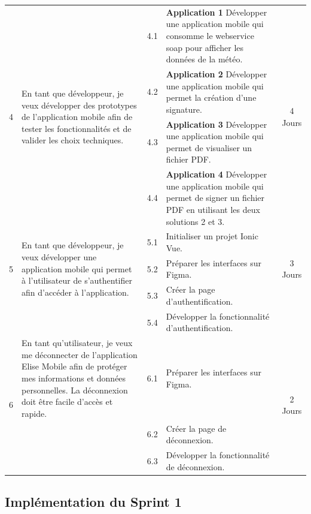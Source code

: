 \begin{adjustwidth}{-1cm}{}
\begin{longtable}{|c|p{6cm}|c|p{6cm}|c|}
    \cline{1-5}
    \multirow{4}{*}{4} & \multirow{4}{6cm}{En tant que développeur, je veux développer des prototypes de l'application mobile afin de tester les fonctionnalités et de valider les choix techniques.} &  4.1 &\textbf{Application 1} Développer une application mobile qui consomme le webservice soap pour afficher les données de la météo.&\multirow{4}{2cm}{4 Jours}\\
    \cline{3-4}
    &  &  4.2 &\textbf{Application 2} Développer une application mobile qui permet la création d'une signature.&\\
    \cline{3-4}
    &  &  4.3 &\textbf{Application 3} Développer une application mobile qui permet de visualiser un fichier PDF.&\\
    \cline{3-4}
    &  &  4.4 &\textbf{Application 4} Développer une application mobile qui permet de signer un fichier PDF en utilisant les deux solutions 2 et 3.&\\
    \cline{1-5}
    \multirow{3}{*}{5} & \multirow{3}{6cm}{En tant que développeur, je veux développer une application mobile qui permet à l'utilisateur de s'authentifier afin d'accéder à l'application.} & 
    
    5.1 &Initialiser un projet Ionic Vue.&\multirow{3}{2cm}{3 Jours}\\
    \cline{3-4}
      & & 5.2 & Préparer les interfaces sur Figma.&\\
    \cline{3-4}
    &  &  5.3 & Créer la page d'authentification. &\\
    \cline{3-4}
    &  &  5.4 & Développer la fonctionnalité d'authentification.&\\
  \hline
  \multirow{3}{*}{6} & En tant qu'utilisateur, je veux me déconnecter de l'application Elise Mobile afin de protéger mes informations et données personnelles. La déconnexion doit être facile d'accès et rapide. &  6.1 &Préparer les interfaces sur Figma.&\multirow{3}{2cm}{2 Jours}\\
  \cline{3-4}
  &  &  6.2 &Créer la page de déconnexion.&\\
  \cline{3-4}
  &  &  6.3 &Développer la fonctionnalité de déconnexion.&\\
  \hline

\end{longtable}
\end{adjustwidth}
\subsection{Implémentation du Sprint 1}

